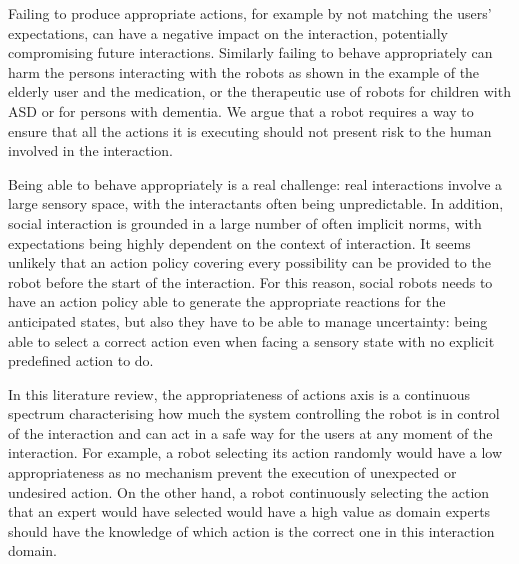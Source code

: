     Failing to produce appropriate actions, for example by not matching the
    users' expectations, can have a negative impact on the interaction,
    potentially compromising future interactions. Similarly failing to behave
    appropriately can harm the persons interacting with the robots as shown in
    the example of the elderly user and the medication, or the therapeutic use
    of robots for children with ASD or for persons with dementia.  We argue that
    a robot requires a way to ensure that all the actions it is executing should
    not present risk to the human involved in the interaction.
	

    Being able to behave appropriately is a real challenge: real interactions
    involve a large sensory space, with the interactants often being
    unpredictable. In addition, social interaction is grounded in a large number
    of often implicit norms, with expectations being highly dependent on the
    context of interaction.  It seems unlikely that an action policy covering
    every possibility can be provided to the robot before the start of the
    interaction. For this reason, social robots needs to have an action policy
    able to generate the appropriate reactions for the anticipated states, but
    also they have to be able to manage uncertainty: being able to select a
    correct action even when facing a sensory state with no explicit predefined
    action to do. 

    In this literature review, the appropriateness of actions axis is a
    continuous spectrum characterising how much the system controlling the robot
    is in control of the interaction and can act in a safe way for the users at
    any moment of the interaction. For example, a robot selecting its action
    randomly would have a low appropriateness as no mechanism prevent the
    execution of unexpected or undesired action. On the other hand, a robot
    continuously selecting the action that an expert would have selected would
    have a high value as domain experts should have the knowledge of which
    action is the correct one in this interaction domain.



